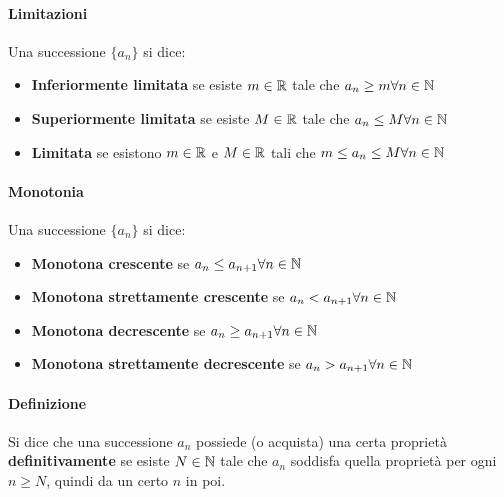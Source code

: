 \documentclass[12pt, a4paper, openany]{book}
\begin{document}
\paragraph*{Limitazioni} Una successione $\{a_n\}$ si dice:
\begin{itemize}
	\item \textbf{Inferiormente limitata} se esiste $m \in \mathbb{R}$ tale che $a_n \geq m \forall n \in \mathbb{N}$
	\item \textbf{Superiormente limitata} se esiste $M \in \mathbb{R}$ tale che $a_n \leq M \forall n \in \mathbb{N}$
	\item \textbf{Limitata} se esistono $m \in \mathbb{R}$ e $M \in \mathbb{R}$ tali che $m \leq a_n \leq M \forall n \in \mathbb{N}$
\end{itemize}

\paragraph*{Monotonia} Una successione $\{a_n\}$ si dice:
\begin{itemize}
	\item \textbf{Monotona crescente} se $a_n\leq a_{n+1} \forall n \in \mathbb{N}$
	\item \textbf{Monotona strettamente crescente} se $a_n < a_{n+1} \forall n \in \mathbb{N}$
	\item \textbf{Monotona decrescente} se $a_n \geq a_{n+1} \forall n\in\mathbb{N}$
	\item \textbf{Monotona strettamente decrescente} se $a_n > a_{n+1} \forall n \in \mathbb{N}$
\end{itemize}

\paragraph*{Definizione} Si dice che una successione {$a_n$} possiede (o acquista) una certa proprietà \textbf{definitivamente} se esiste $N \in \mathbb{N}$ tale che
$a_n$ soddisfa quella proprietà per ogni $n \geq N$, quindi da un certo $n$ in poi.

\end{document}
